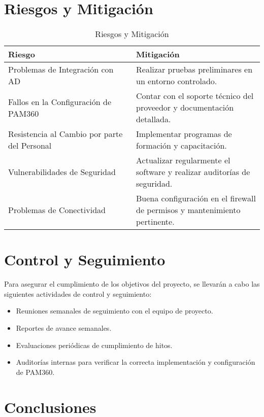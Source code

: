 \section{Riesgos y Mitigación}

\begin{table}[H]
	\centering
	\begin{adjustbox}{max width=\textwidth}
		\begin{tabular}{|p{0.5\linewidth}|p{0.5\linewidth}|}
			\hline
			\textbf{Riesgo} & \textbf{Mitigación} \\ \hline
			Problemas de Integración con AD & Realizar pruebas preliminares en un entorno controlado. \\ \hline
			Fallos en la Configuración de PAM360 & Contar con el soporte técnico del proveedor y documentación detallada. \\ \hline
			Resistencia al Cambio por parte del Personal & Implementar programas de formación y capacitación. \\ \hline
			Vulnerabilidades de Seguridad & Actualizar regularmente el software y realizar auditorías de seguridad. \\ \hline
			Problemas de Conectividad & Buena configuración en el firewall de permisos y mantenimiento pertinente. \\ \hline
		\end{tabular}
	\end{adjustbox}
	\caption{Riesgos y Mitigación}
	\label{tab:riesgos_mitigacion}
\end{table}

\section{Control y Seguimiento}

Para asegurar el cumplimiento de los objetivos del proyecto, se llevarán a cabo las siguientes actividades de control y seguimiento:

\begin{itemize}
	\item Reuniones semanales de seguimiento con el equipo de proyecto.
	\item Reportes de avance semanales.
	\item Evaluaciones periódicas de cumplimiento de hitos.
	\item Auditorías internas para verificar la correcta implementación y configuración de PAM360.
\end{itemize}


\section{Conclusiones}

